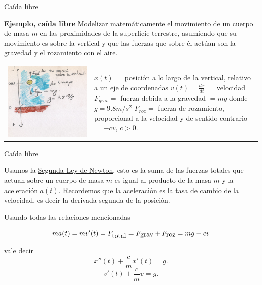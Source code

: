 \documentclass[handout,hyperref={colorlinks=true}]{beamer}
\newcommand{\nl}{\onslide<+-> }
\begin{document}
\begin{frame}{Caída libre}

\nl \textbf{Ejemplo, \href{http://es.wikipedia.org/wiki/Caída_libre}{caída libre}} Modelizar matemáticamente el movimiento de un cuerpo de masa $m$ en las proximidades de la superficie
terrestre, asumiendo que su movimiento es
sobre la vertical y que las fuerzas que sobre él actúan son la gravedad y el rozamiento con el aire.

\nl \begin{tabular}{m{4.5cm} m{5cm}} \includegraphics[scale=0.07]{imagenes/caida_libre.jpg}    &  $x(t)=$ posición a lo largo de la vertical, relativo a un eje de coordenadas\newline
$v(t)=\frac{dx}{dt}=$ velocidad\newline
$F_{grav}=$ fuerza debida a la gravedad $=mg$ donde $g=9.8m/s^2$
$F_{roz}=$ fuerza de rozamiento, proporcional a la velocidad y de sentido contrario $=-cv$, $c>0$.

\end{tabular} 
\end{frame}
\begin{frame}{Caída libre}

\nl Usamos la \href{http://es.wikipedia.org/wiki/Leyes_de_Newton}{Segunda Ley de Newton}, esto es la suma de las fuerzas totales que actuan sobre un cuerpo de masa $m$
es igual al producto de la masa $m$ y la aceleración $a(t)$. Recordemos que la aceleración es la tasa de cambio de la velocidad, es decir la derivada segunda de la posición.   

\nl  Usando todas las relaciones mencionadas

\[ma(t)=mv'(t)=F_{\hbox{total}}=F_{\hbox{grav}}+F_{\hbox{roz}}=mg-cv\]

vale decir
\begin{equation}\label{caidaLibre1}
 \boxed{ x''(t)+\frac{c}{m} x'(t)=g.}
\end{equation}
\begin{equation}\label{caidaLibre2}
\boxed{ v'(t)+\frac{c}{m} v=g.}
\end{equation}
\end{frame}
\end{document}
